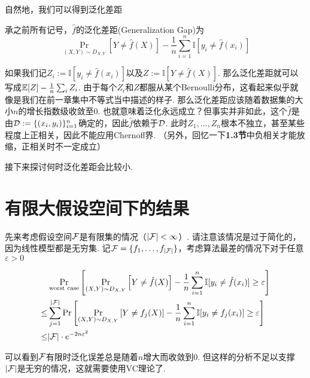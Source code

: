 自然地，我们可以得到泛化差距
\begin{definition}
    承之前所有记号，$\hat f$的泛化差距(Generalization Gap)为 
    \[
    \Pr_{(X, Y) \sim D_{X,Y}}\left[
        Y \neq \hat f(X)
    \right] - \dfrac{1}{n} \sum_{i=1}^n \mathbb{I}[y_i \neq \hat f(x_i)]
    \]
\end{definition}

如果我们记$Z_i := \mathbb{I}[y_i \neq \hat f(x_i)]$以及$Z := \mathbb{I}[Y \neq \hat f(X)]$. 那么泛化差距就可以写成$\mathbb{E}[Z] - \frac{1}{n} \sum_i Z_i$. 由于每个$Z_i$和$Z$都服从某个Bernoulli分布，这看起来似乎就像是我们在前一章集中不等式当中描述的样子. 那么泛化差距应该随着数据集的大小$n$的增长指数级收敛至$0$. 也就意味着泛化永远成立？但事实并非如此，这个$\hat f$是由$\mathcal{D} := \{(x_i, y_i)\}_{i=1}^n$确定的，因此$\hat f$依赖于$\mathcal{D}$. 此时$Z_1, \dots, Z_n$根本不独立，甚至某些程度上正相关，因此不能应用Chernoff界. （另外，回忆一下\textbf{1.3节}中负相关才能放缩，正相关时不一定成立）

接下来探讨何时泛化差距会比较小. 

\section{有限大假设空间下的结果}

先来考虑假设空间$\mathcal{F}$是有限集的情况（$|\mathcal{F}| < \infty$）. 请注意该情况是过于简化的，因为线性模型都是无穷集. 记$\mathcal{F} = \{f_1, \dots, f_{|\mathcal{F}|}\}$，考虑算法最差的情况下对于任意$\varepsilon > 0$

\begin{align*}
    & \Pr_{\text{worst case}} \left[
        \Pr_{(X, Y) \sim D_{X,Y}} \left[
            Y \neq \hat f (X)
        \right] - \dfrac{1}{n} \sum_{i=1}^n \mathbb{I}[y_i \neq \hat f(x_i)] \ge \varepsilon
    \right] \\
    \le & 
    \sum_{j=1}^{|\mathcal{F}|} \Pr\left[
        \Pr_{(X, Y) \sim D_{X,Y}} \left[
            Y \neq f_j (X)
        \right] - \dfrac{1}{n} \sum_{i=1}^n \mathbb{I}[y_i \neq f_j(x_i)] \ge \varepsilon
    \right] \\ 
    \le & |\mathcal{F}| \cdot e^{-2n\varepsilon^2}
\end{align*}

可以看到$\mathcal{F}$有限时泛化误差总是随着$n$增大而收敛到0. 但这样的分析不足以支撑$|\mathcal{F}|$是无穷的情况，这就需要使用VC理论了.